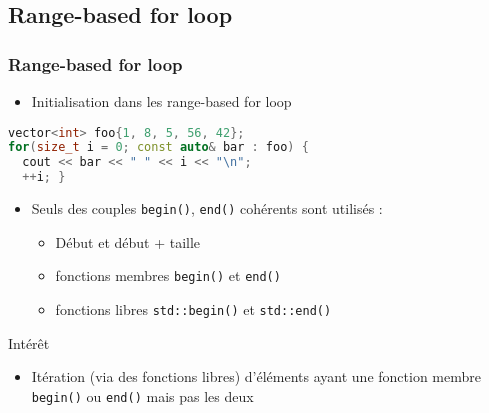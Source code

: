 \documentclass[C++.tex]{subfiles}
\begin{document}
\subsection*{Range-based for loop}
\begin{frame}[fragile]
	\frametitle{Range-based for loop}
	\begin{itemize}
		\item Initialisation dans les range-based for loop
	\end{itemize}

	\begin{lstlisting}[language=C++]
vector<int> foo{1, 8, 5, 56, 42};
for(size_t i = 0; const auto& bar : foo) {
  cout << bar << " " << i << "\n";
  ++i; }\end{lstlisting}

	\begin{itemize}
		\item Seuls des couples \lstinline|begin()|, \lstinline|end()| cohérents sont utilisés :
		\begin{itemize}
			\item \og Début\fg{} et \og début + taille\fg{}
			\item fonctions membres \lstinline|begin()| et \lstinline|end()|
			\item fonctions libres \lstinline|std::begin()| et \lstinline|std::end()|
		\end{itemize}
	\end{itemize}

	\begin{block}{Intérêt}
		\begin{itemize}
			\item Itération (via des fonctions libres) d'éléments ayant une fonction membre \lstinline|begin()| ou \lstinline|end()| mais pas les deux
		\end{itemize}
	\end{block}



\end{frame}
\end{document}
